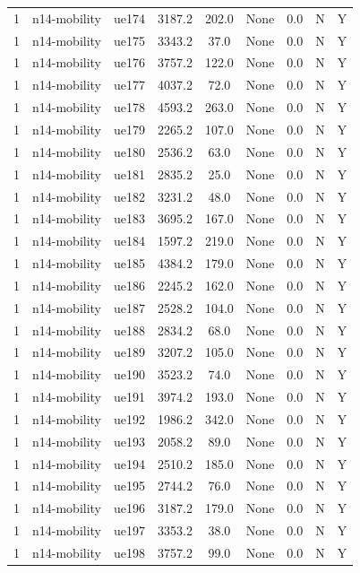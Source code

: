 \begin{table}[ht]
\begin{tabular}{|c|c|c|c|c|c|c|c|c|}
1 & n14-mobility & ue174 & 3187.2 & 202.0 & None & 0.0 & N & Y \\
1 & n14-mobility & ue175 & 3343.2 & 37.0 & None & 0.0 & N & Y \\
1 & n14-mobility & ue176 & 3757.2 & 122.0 & None & 0.0 & N & Y \\
1 & n14-mobility & ue177 & 4037.2 & 72.0 & None & 0.0 & N & Y \\
1 & n14-mobility & ue178 & 4593.2 & 263.0 & None & 0.0 & N & Y \\
1 & n14-mobility & ue179 & 2265.2 & 107.0 & None & 0.0 & N & Y \\
1 & n14-mobility & ue180 & 2536.2 & 63.0 & None & 0.0 & N & Y \\
1 & n14-mobility & ue181 & 2835.2 & 25.0 & None & 0.0 & N & Y \\
1 & n14-mobility & ue182 & 3231.2 & 48.0 & None & 0.0 & N & Y \\
1 & n14-mobility & ue183 & 3695.2 & 167.0 & None & 0.0 & N & Y \\
1 & n14-mobility & ue184 & 1597.2 & 219.0 & None & 0.0 & N & Y \\
1 & n14-mobility & ue185 & 4384.2 & 179.0 & None & 0.0 & N & Y \\
1 & n14-mobility & ue186 & 2245.2 & 162.0 & None & 0.0 & N & Y \\
1 & n14-mobility & ue187 & 2528.2 & 104.0 & None & 0.0 & N & Y \\
1 & n14-mobility & ue188 & 2834.2 & 68.0 & None & 0.0 & N & Y \\
1 & n14-mobility & ue189 & 3207.2 & 105.0 & None & 0.0 & N & Y \\
1 & n14-mobility & ue190 & 3523.2 & 74.0 & None & 0.0 & N & Y \\
1 & n14-mobility & ue191 & 3974.2 & 193.0 & None & 0.0 & N & Y \\
1 & n14-mobility & ue192 & 1986.2 & 342.0 & None & 0.0 & N & Y \\
1 & n14-mobility & ue193 & 2058.2 & 89.0 & None & 0.0 & N & Y \\
1 & n14-mobility & ue194 & 2510.2 & 185.0 & None & 0.0 & N & Y \\
1 & n14-mobility & ue195 & 2744.2 & 76.0 & None & 0.0 & N & Y \\
1 & n14-mobility & ue196 & 3187.2 & 179.0 & None & 0.0 & N & Y \\
1 & n14-mobility & ue197 & 3353.2 & 38.0 & None & 0.0 & N & Y \\
1 & n14-mobility & ue198 & 3757.2 & 99.0 & None & 0.0 & N & Y \\

\end{tabular}
\end{table}
